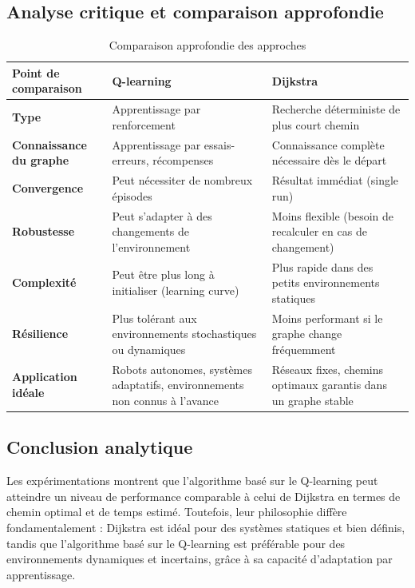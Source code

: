 \documentclass{article}
\begin{document}
\subsection{Analyse critique et comparaison approfondie}
\begin{table}[H]
    \centering
    \begin{tabularx}{\linewidth}{|X|X|X|}
        \hline
        \textbf{Point de comparaison} & \textbf{Q-learning} & \textbf{Dijkstra} \\
        \hline
        \textbf{Type} & Apprentissage par renforcement & Recherche déterministe de plus court chemin \\
   	\hline
        \textbf{Connaissance du graphe} & Apprentissage par essais-erreurs, récompenses & Connaissance complète nécessaire dès le départ \\
   	\hline
        \textbf{Convergence} & Peut nécessiter de nombreux épisodes & Résultat immédiat (single run) \\
  	 \hline
        \textbf{Robustesse} & Peut s'adapter à des changements de l'environnement & Moins flexible (besoin de recalculer en cas de changement) \\
  	 \hline
        \textbf{Complexité} & Peut être plus long à initialiser (learning curve) & Plus rapide dans des petits environnements statiques \\
  	 \hline
        \textbf{Résilience} & Plus tolérant aux environnements stochastiques ou dynamiques & Moins performant si le graphe change fréquemment \\
   	\hline
        \textbf{Application idéale} & Robots autonomes, systèmes adaptatifs, environnements non connus à l'avance & Réseaux fixes, chemins optimaux garantis dans un graphe stable \\
        \hline
    \end{tabularx}
    \caption{Comparaison approfondie des approches}
\end{table}


\subsection{Conclusion  analytique}
Les expérimentations montrent que l'algorithme basé sur le Q-learning peut atteindre un niveau de performance comparable à celui de Dijkstra en termes de chemin optimal et de temps estimé. Toutefois, leur philosophie diffère fondamentalement : Dijkstra est idéal pour des systèmes statiques et bien définis, tandis que l'algorithme basé sur le Q-learning est préférable pour des environnements dynamiques et incertains, grâce à sa capacité d'adaptation par apprentissage.
\end{document}

